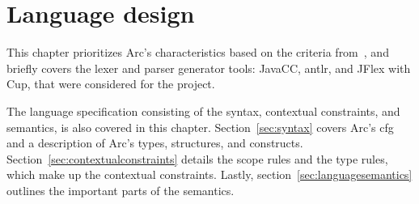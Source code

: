 \chapter{Language design}\label{cha:languagedesign}
This chapter prioritizes Arc's characteristics based on the criteria from~\cite{Sebesta2016}, and briefly covers the lexer and parser generator tools: JavaCC, \gls{antlr}, and JFlex with Cup, that were considered for the project.

The language specification consisting of the syntax, contextual constraints, and semantics, is also covered in this chapter. Section~\ref{sec:syntax} covers Arc's \gls{cfg} and a description of Arc's types, structures, and constructs. Section~\ref{sec:contextualconstraints} details the scope rules and the type rules, which make up the contextual constraints. Lastly, section~\ref{sec:languagesemantics} outlines the important parts of the semantics.







